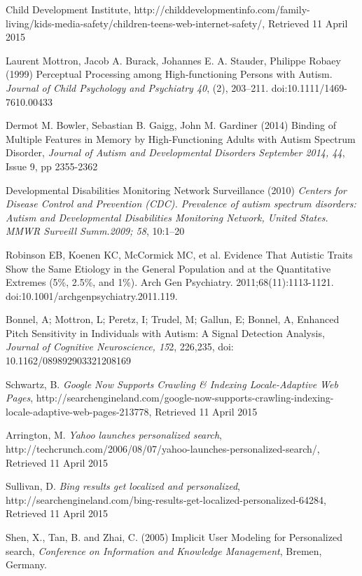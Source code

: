\documentclass[a4paper, 11pt]{article}
\begin{document}
\clearpage
\begin{thebibliography}{100}
 Child Development Institute, http://childdevelopmentinfo.com/family-living/kids-media-safety/children-teens-web-internet-safety/, Retrieved 11 April 2015

 Laurent Mottron, Jacob A. Burack, Johannes E. A. Stauder, Philippe Robaey (1999) Perceptual Processing among High-functioning Persons with Autism. \textit{Journal of Child Psychology and Psychiatry 40}, (2), 203–211. doi:10.1111/1469-7610.00433

Dermot M. Bowler, Sebastian B. Gaigg, John M. Gardiner (2014) Binding of Multiple Features in Memory by High-Functioning Adults with Autism Spectrum Disorder, \textit{Journal of Autism and Developmental Disorders September 2014, 44}, Issue 9, pp 2355-2362

Developmental Disabilities Monitoring Network Surveillance (2010) \textit{Centers for Disease Control and Prevention (CDC). Prevalence of autism spectrum disorders: Autism and Developmental Disabilities Monitoring Network, United States. MMWR Surveill Summ.2009; 58}, 10:1–20

 Robinson EB, Koenen KC, McCormick MC, et al. Evidence That Autistic Traits Show the Same Etiology in the General Population and at the Quantitative Extremes (5\%, 2.5\%, and 1\%). Arch Gen Psychiatry. 2011;68(11):1113-1121. doi:10.1001/archgenpsychiatry.2011.119.

 Bonnel, A; Mottron, L; Peretz, I; Trudel, M; Gallun, E; Bonnel, A, Enhanced Pitch Sensitivity in Individuals with Autism: A Signal Detection Analysis, \textit{Journal of Cognitive Neuroscience, 15}2, 226,235, doi: 10.1162/089892903321208169

Schwartz, B. \textit{Google Now Supports Crawling \& Indexing Locale-Adaptive Web Pages}, http://searchengineland.com/google-now-supports-crawling-indexing-locale-adaptive-web-pages-213778, Retrieved 11 April 2015

Arrington, M. \textit{Yahoo launches personalized search}, http://techcrunch.com/2006/08/07/yahoo-launches-personalized-search/, Retrieved 11 April 2015

Sullivan, D. \textit{Bing results get localized and personalized}, http://searchengineland.com/bing-results-get-localized-personalized-64284, Retrieved 11 April 2015

Shen, X., Tan, B. and Zhai, C. (2005) Implicit User Modeling for Personalized search, \textit{Conference on Information and Knowledge Management}, Bremen, Germany.


\end{thebibliography}
\end{document}
